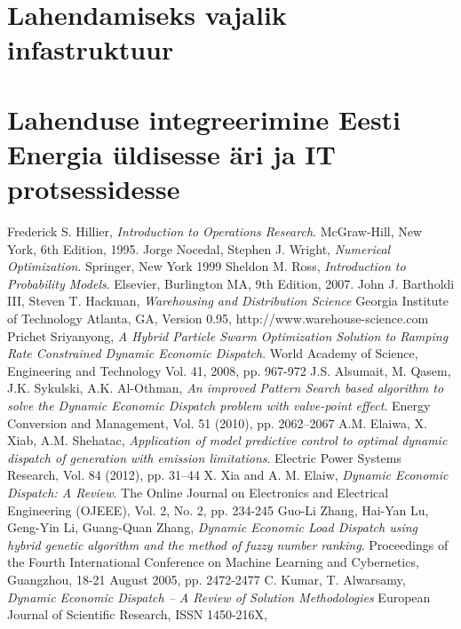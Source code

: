 \documentclass[twosided, 10pt, a4paper]{article}
\begin{document}
\section{Lahendamiseks vajalik infastruktuur}

\section{Lahenduse integreerimine Eesti Energia \"uldisesse \"ari ja IT protsessidesse}


\begin{thebibliography}{9}
  Frederick S. Hillier,
  \emph{Introduction to Operations Research}.
  McGraw-Hill, New York,
  6th Edition,
  1995.
  Jorge Nocedal, Stephen J. Wright,
  \emph{Numerical Optimization}.
  Springer, New York
  1999
  Sheldon M. Ross,
  \emph{Introduction to Probability Models}.
  Elsevier, Burlington MA,
  9th Edition,
  2007.
  John J. Bartholdi III, Steven T. Hackman,
  \emph{Warehousing and Distribution Science}
  Georgia Institute of Technology Atlanta, GA,
  Version 0.95, http://www.warehouse-science.com
  Prichet Sriyanyong,
  \emph{A Hybrid Particle Swarm Optimization Solution to Ramping Rate Constrained Dynamic Economic Dispatch}.
  World Academy of Science, Engineering and Technology
  Vol. 41, 2008, pp. 967-972
  J.S. Alsumait, M. Qasem, J.K. Sykulski, A.K. Al-Othman,
  \emph{An improved Pattern Search based algorithm to solve the Dynamic Economic Dispatch problem with valve-point effect}.
  Energy Conversion and Management,
  Vol. 51 (2010), pp. 2062–2067
  A.M. Elaiwa, X. Xiab, A.M. Shehatac,
 \emph{Application of model predictive control to optimal dynamic dispatch of generation with emission limitations}.
 Electric Power Systems Research,
 Vol. 84 (2012), pp. 31–44
X. Xia and A. M. Elaiw,
\emph{Dynamic Economic Dispatch: A Review}.
The Online Journal on Electronics and Electrical Engineering (OJEEE),
Vol. 2, No. 2, pp. 234-245
Guo-Li Zhang, Hai-Yan Lu, Geng-Yin Li, Guang-Quan Zhang,
\emph{Dynamic Economic Load Dispatch using hybrid genetic algorithm and the method of fuzzy number ranking}.
Proceedings of the Fourth International Conference on Machine Learning and Cybernetics,
Guangzhou, 18-21 August 2005, pp. 2472-2477
C. Kumar, T. Alwarsamy,
\emph{Dynamic Economic Dispatch – A Review of Solution Methodologies}
European Journal of Scientific Research, ISSN 1450-216X,

\end{thebibliography}
\end{document}
